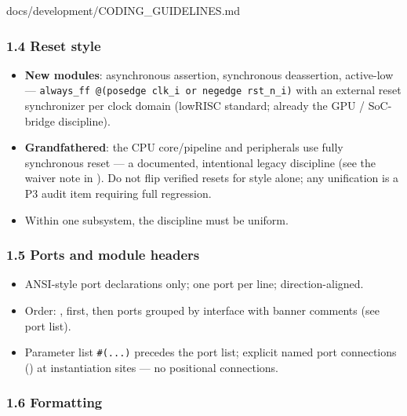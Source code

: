 \begin{relocated}{docs/development/CODING_GUIDELINES.md}
\subsubsection{1.4 Reset style}\label{um:guide:coding-guidelines:14-reset-style}

\begin{itemize}
\tightlist
\item
  \textbf{New modules}: asynchronous assertion, synchronous deassertion,
  active-low ---
  \texttt{always\_\allowbreak{}ff\ @(posedge\ clk\_\allowbreak{}i\ or\ negedge\ rst\_\allowbreak{}n\_\allowbreak{}i)}
  with an external reset synchronizer per clock domain (lowRISC
  standard; already the GPU / SoC-bridge discipline).
\item
  \textbf{Grandfathered}: the CPU core/\allowbreak{}pipeline and
  peripherals use fully synchronous reset --- a documented, intentional
  legacy discipline (see the  waiver note in
   ). Do not flip verified resets for
  style alone; any unification is a P3 audit item requiring full
  regression.
\item
  Within one subsystem, the discipline must be uniform.
\end{itemize}

\subsubsection{1.5 Ports and module headers}\label{um:guide:coding-guidelines:15-ports-and-module-headers}

\begin{itemize}
\tightlist
\item
  ANSI-style port declarations only; one port per line;
  direction-aligned.
\item
  Order: ,  first, then ports grouped by
  interface with banner comments (see  port
  list).
\item
  Parameter list \texttt{\#(.\allowbreak{}.\allowbreak{}.\allowbreak{})}
  precedes the port list; explicit named port connections ()
  at instantiation sites --- no positional connections.
\end{itemize}

\subsubsection{1.6 Formatting}\label{um:guide:coding-guidelines:16-formatting}


\end{relocated}
